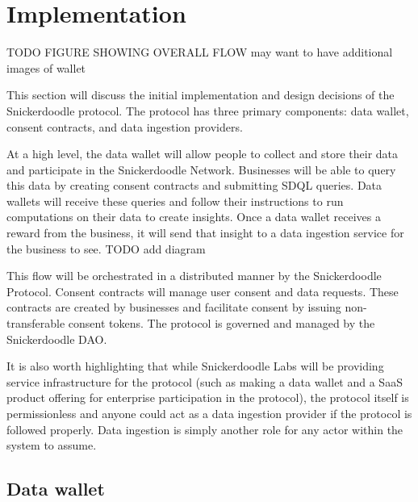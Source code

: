 \section{Implementation}
\label{section:Implementation}
TODO FIGURE SHOWING OVERALL FLOW
        may want to have additional images of wallet



This section will discuss the initial implementation and design decisions of the Snickerdoodle protocol. The protocol has three primary components: data wallet, consent contracts, and data ingestion providers.

At a high level, the data wallet will allow people to collect and store their data and participate in the Snickerdoodle Network. Businesses will be able to query this data by creating consent contracts and submitting SDQL queries. Data wallets will receive these queries and follow their instructions to run computations on their data to create insights. Once a data wallet receives a reward from the business, it will send that insight to a data ingestion service for the business to see. TODO add diagram

This flow will be orchestrated in a distributed manner by the Snickerdoodle Protocol. Consent contracts will manage user consent and data requests. These contracts are created by businesses and facilitate consent by issuing non-transferable consent tokens. The protocol is governed and managed by the Snickerdoodle DAO. 

It is also worth highlighting that while Snickerdoodle Labs will be providing service infrastructure for the protocol (such as making a data wallet and a SaaS product offering for enterprise participation in the protocol), the protocol itself is permissionless and anyone could act as a data ingestion provider if the protocol is followed properly. Data ingestion is simply another role for any actor within the system to assume.

\subsection{Data wallet}
\label{section:DataWallet}
%


